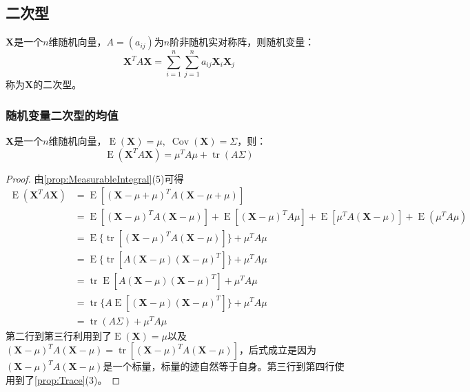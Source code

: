 \subsection{二次型}
\begin{definition}
	$\mathbf{X}$是一个$n$维随机向量，$A=(a_{ij})$为$n$阶非随机实对称阵，则随机变量：
	\begin{equation*}
		\mathbf{X}^TA\mathbf{X}=\sum_{i=1}^{n}\sum_{j=1}^{n}a_{ij}\mathbf{X}_i\mathbf{X}_j
	\end{equation*}
	称为$\mathbf{X}$的二次型。
\end{definition}
\subsubsection{随机变量二次型的均值}
\begin{theorem}\label{theo:ERVQuadraticForm}
	$\mathbf{X}$是一个$n$维随机向量，$\operatorname{E}(\mathbf{X})=\mu,\;\operatorname{Cov}(\mathbf{X})=\Sigma$，则：
	\begin{equation*}
		\operatorname{E}(\mathbf{X}^TA\mathbf{X})=\mu^TA\mu+\operatorname{tr}(A\Sigma)
	\end{equation*}	
\end{theorem}
\begin{proof}
	由\cref{prop:MeasurableIntegral}(5)可得
	\begin{align*}
		\operatorname{E}(\mathbf{X}^TA\mathbf{X})
		&=\operatorname{E}[(\mathbf{X}-\mu+\mu)^TA(\mathbf{X}-\mu+\mu)] \\
		&=\operatorname{E}[(\mathbf{X}-\mu)^TA(\mathbf{X}-\mu)]+\operatorname{E}[(\mathbf{X}-\mu)^TA\mu]+\operatorname{E}[\mu^TA(\mathbf{X}-\mu)]+\operatorname{E}(\mu^TA\mu) \\
		&=\operatorname{E}\{\operatorname{tr}[(\mathbf{X}-\mu)^TA(\mathbf{X}-\mu)]\}+\mu^TA\mu \\
		&=\operatorname{E}\{\operatorname{tr}[A(\mathbf{X}-\mu)(\mathbf{X}-\mu)^T]\}+\mu^TA\mu \\
		&=\operatorname{tr}\operatorname{E}[A(\mathbf{X}-\mu)(\mathbf{X}-\mu)^T]+\mu^TA\mu \\
		&=\operatorname{tr}\{A\operatorname{E}[(\mathbf{X}-\mu)(\mathbf{X}-\mu)^T]\}+\mu^TA\mu \\
		&=\operatorname{tr}(A\Sigma)+\mu^TA\mu
	\end{align*}
	第二行到第三行利用到了$\operatorname{E}(\mathbf{X})=\mu$以及$(\mathbf{X}-\mu)^TA(\mathbf{X}-\mu)=\operatorname{tr}[(\mathbf{X}-\mu)^TA(\mathbf{X}-\mu)]$，后式成立是因为$(\mathbf{X}-\mu)^TA(\mathbf{X}-\mu)$是一个标量，标量的迹自然等于自身。第三行到第四行使用到了\cref{prop:Trace}(3)。
\end{proof}
